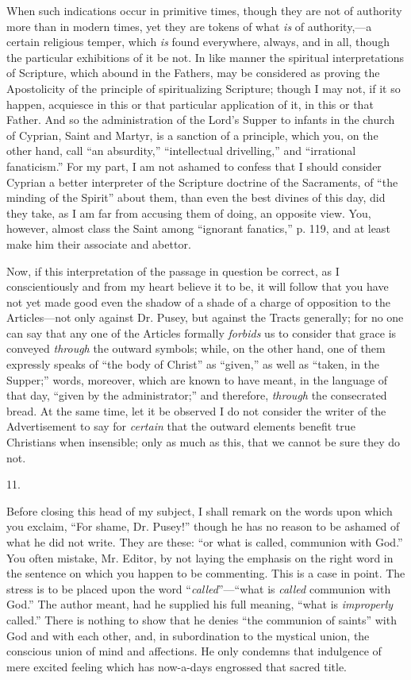 When such indications occur in primitive times,
though they are not of authority more than in modern times, yet they
are tokens of what \emph{is} of authority,—a certain religious
temper, which \emph{is} found everywhere, always, and in all, though the
particular exhibitions of it be not. In like manner the
spiritual interpretations of Scripture, which abound in the Fathers,
may be considered as proving the Apostolicity of the principle of
spiritualizing Scripture; though I may not, if it so happen, acquiesce
in this or that particular application of it, in this or that Father.
And so the administration of the Lord's Supper to infants in the
church of Cyprian, Saint and Martyr, is a sanction of a principle,
which you, on the other hand, call ``an absurdity,'' ``intellectual
drivelling,'' and ``irrational fanaticism.'' For my part, I am not
ashamed to confess that I should consider Cyprian a better interpreter
of the Scripture doctrine of the Sacraments, of ``the minding of the
Spirit'' about them, than even the best divines of this day, did they
take, as I am far from accusing them of doing, an opposite view. You,
however, almost class the Saint among ``ignorant fanatics,'' p. 119, and
at least make him their associate and abettor.

Now, if this interpretation of the passage in
question be correct, as I conscientiously and from my heart believe it
to be, it will follow that you have not yet made good even the shadow
of a shade of a charge of opposition to the Articles—not only
against Dr. Pusey, but against the Tracts generally; for no one can
say that any one of the Articles formally \emph{forbids} us to
consider that grace is conveyed \emph{through} the outward symbols;
while, on the other hand, one of them expressly speaks of ``the body of
Christ'' as ``given,'' as well as ``taken, in the Supper;'' words,
moreover, which are known to have meant, in the language of that day, ``given
by the administrator;'' and therefore, \emph{through} the consecrated
bread. At the same time, let it be observed I do not consider the
writer of the Advertisement to say for \emph{certain} that the outward
elements benefit true Christians when insensible; only as much as
this, that we cannot be sure they do not.

11.

Before closing this head of my subject, I shall
remark on the words upon which you exclaim, ``For shame, Dr. Pusey!''
though he has no reason to be ashamed of what he did not write. They
are these: ``or what is called, communion with God.'' You often mistake,
Mr. Editor, by not laying the emphasis on the right word in the
sentence on which you happen to be commenting. This is a case in
point. The stress is to be placed upon the word ``\emph{called}''—``what
is \emph{called} communion with God.'' The author meant, had he
supplied his full meaning, ``what is \emph{improperly} called.'' There
is nothing to show that he denies ``the communion of saints'' with God
and with each other, and, in subordination to the mystical union, the
conscious union of mind and affections. He only condemns that
indulgence of mere excited feeling which has now-a-days engrossed that
sacred title.

